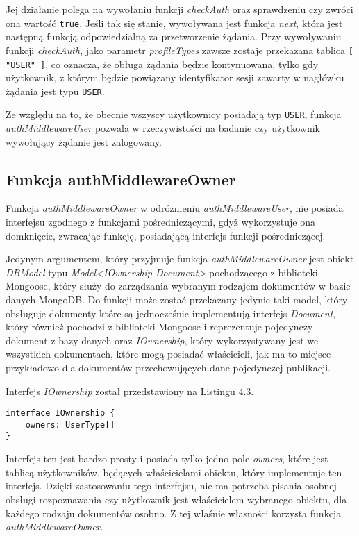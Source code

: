 \documentclass[a4paper,12pt,twoside,openany]{report}
\begin{document}
Jej działanie polega na wywołaniu funkcji \textit{checkAuth} oraz sprawdzeniu czy zwróci ona wartość \verb|true|. Jeśli tak się stanie, wywoływana jest funkcja \textit{next}, która jest następną funkcją odpowiedzialną za przetworzenie żądania.
Przy wywoływaniu funkcji \textit{checkAuth}, jako parametr \textit{profileTypes}  zawsze zostaje przekazana tablica \verb|[ "USER" ]|, co oznacza, że obługa żądania będzie kontynuowana, tylko gdy użytkownik, z którym będzie powiązany identyfikator sesji zawarty w nagłówku żądania jest typu \verb|USER|. 

Ze względu na to, że obecnie wszyscy użytkownicy posiadają typ \verb|USER|, funkcja \textit{authMiddlewareUser} pozwala w rzeczywistości na badanie czy użytkownik wywołujący żądanie jest zalogowany.

\subsection{Funkcja authMiddlewareOwner}
Funkcja \textit{authMiddlewareOwner} w odróżnieniu \textit{authMiddlewareUser}, nie posiada interfejsu zgodnego z funkcjami pośredniczącymi, gdyż wykorzystuje ona domknięcie, zwracając funkcję, posiadającą interfejs funkcji pośredniczącej.


Jedynym argumentem, który przyjmuje funkcja \textit{authMiddlewareOwner} jest obiekt \textit{DBModel} typu \textit{Model<IOwnership  Document>} pochodzącego z biblioteki Mongoose, który służy do zarządzania wybranym rodzajem dokumentów w bazie danych MongoDB. Do funkcji może zostać przekazany jedynie taki model, który obsługuje dokumenty które są jednocześnie implementują interfejs \textit{Document}, który również pochodzi  z biblioteki Mongoose i reprezentuje pojedynczy dokument z bazy danych oraz \textit{IOwnership}, który wykorzystywany jest we wszystkich dokumentach, które mogą posiadać właścicieli, jak ma to miejsce przykładowo dla dokumentów przechowujących dane pojedynczej publikacji. 

Interfejs \textit{IOwnership} został przedstawiony na Listingu 4.3.
\begin{lstlisting}[caption=Interfejs IOwnership,label=code1,captionpos=b]
interface IOwnership {
	owners: UserType[]
} 
\end{lstlisting}
Interfejs ten jest bardzo prosty i posiada tylko jedno pole \textit{owners}, które jest tablicą użytkowników, będących właścicielami obiektu, który implementuje ten interfejs. Dzięki zastosowaniu tego interfejsu, nie ma potrzeba pisania osobnej obsługi rozpoznawania czy użytkownik jest właścicielem wybranego obiektu, dla każdego rodzaju dokumentów osobno. Z tej właśnie własności korzysta funkcja \textit{authMiddlewareOwner}.
\end{document}
